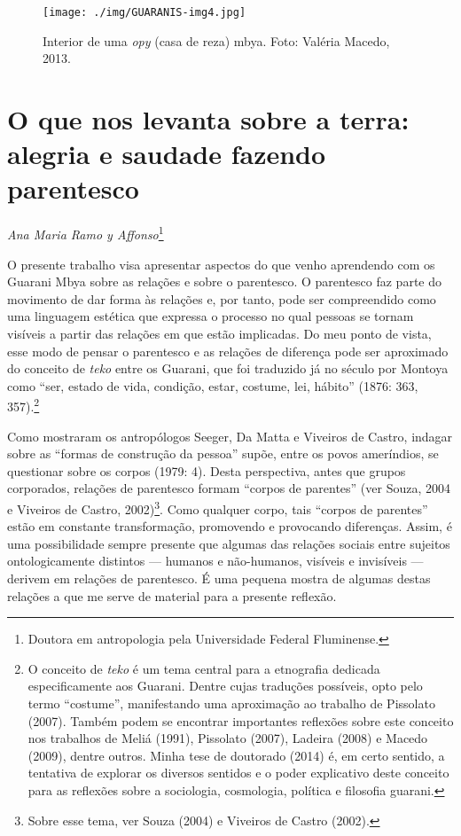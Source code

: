 \begin{figure}
  \centering
 \texttt{[image: ./img/GUARANIS-img4.jpg]}	
  \hfill
  \caption{Interior de uma \emph{opy} (casa de reza) mbya. Foto: Valéria Macedo, 2013.}
\end{figure}


\chapter{O que nos levanta sobre a terra: alegria e saudade fazendo
parentesco}
\begin{flushright}
\emph{Ana Maria Ramo y Affonso}\footnote{Doutora em antropologia pela
Universidade Federal Fluminense.}
\end{flushright}

O presente trabalho visa apresentar aspectos do que venho aprendendo com
os Guarani Mbya sobre as relações e sobre o parentesco. O parentesco
faz parte do movimento de dar forma às relações e, por tanto, pode ser
compreendido como uma linguagem estética que expressa o processo no
qual pessoas se tornam visíveis a partir das relações em que estão
implicadas. Do meu ponto de vista, esse modo de pensar o parentesco e
as relações de diferença pode ser aproximado do conceito de \emph{teko} entre
os Guarani, que foi traduzido já no século  por Montoya como ``ser,
estado de vida, condição, estar, costume, lei, hábito'' (1876: 363,
357).\footnote{O conceito de \emph{teko} é um tema central para a etnografia
dedicada especificamente aos Guarani. Dentre cujas traduções possíveis,
opto pelo termo ``costume'', manifestando uma aproximação ao trabalho de
Pissolato (2007). Também podem se encontrar importantes reflexões sobre
este conceito nos trabalhos de Meliá (1991), Pissolato (2007), Ladeira
(2008) e Macedo (2009), dentre outros. Minha tese de doutorado (2014)
é, em certo sentido, a tentativa de explorar os diversos sentidos e o
poder explicativo deste conceito para as reflexões sobre a sociologia,
cosmologia, política e filosofia guarani.}

Como mostraram os antropólogos Seeger, Da Matta e Viveiros de Castro,
indagar sobre as ``formas de construção da pessoa'' supõe, entre os povos
ameríndios, se questionar sobre os corpos (1979: 4). Desta perspectiva,
antes que grupos corporados, relações de parentesco formam ``corpos de
parentes'' (ver Souza, 2004 e Viveiros de Castro, 2002)\footnote{Sobre
esse tema, ver Souza (2004) e Viveiros de Castro (2002).}. Como
qualquer corpo, tais ``corpos de parentes'' estão em constante
transformação, promovendo e provocando diferenças. Assim, é uma
possibilidade sempre presente que algumas das relações sociais entre
sujeitos ontologicamente distintos --- humanos e não-humanos, visíveis e
invisíveis --- derivem em relações de parentesco. É uma pequena mostra de
algumas destas relações a que me serve de material para a presente
reflexão.

